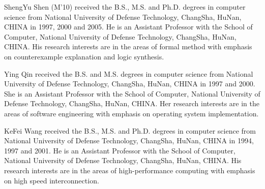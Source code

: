 \documentclass[journal]{IEEEtran}
\begin{document}
\begin{IEEEbiography}{ShengYu Shen}
(M'10) received the B.S., M.S.
and Ph.D. degrees in computer science from
National University of Defense Technology, ChangSha, HuNan, CHINA in 1997, 2000 and 2005.
He is an Assistant Professor with the School of Computer,
National University of Defense Technology, ChangSha, HuNan, CHINA.
His research
interests are in the areas of formal method with emphasis on counterexample explanation
and logic synthesis.
\end{IEEEbiography}

\begin{IEEEbiography}{Ying Qin}
 received the B.S. and M.S.
degrees in computer science from
National University of Defense Technology, ChangSha, HuNan, CHINA in 1997 and 2000.
She is an Assistant Professor with the School of Computer,
National University of Defense Technology, ChangSha, HuNan, CHINA.
Her research
interests are in the areas of software engineering with emphasis on operating system implementation.
\end{IEEEbiography}
\newpage
\begin{IEEEbiographynophoto}{KeFei Wang}
received the B.S., M.S.
and Ph.D. degrees in computer science from
National University of Defense Technology, ChangSha, HuNan, CHINA in 1994, 1997 and 2001.
He is an Assistant Professor with the School of Computer,
National University of Defense Technology, ChangSha, HuNan, CHINA.
His research
interests are in the areas of high-performance computing with emphasis on high speed interconnection.
\end{IEEEbiographynophoto}
\end{document}
